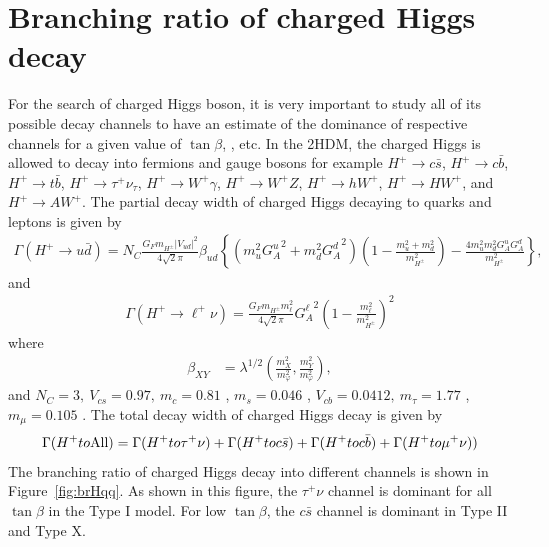 \section{Branching ratio of charged Higgs decay}
\label{s:brHqq}
For the search of charged Higgs boson, it is very important to study all of its 
possible decay channels to have an estimate of the dominance of respective
channels for a given value of $\tan\beta$, \mHp, etc. In the 2HDM, the charged
Higgs is allowed to decay into fermions and gauge bosons for example 
$H^+ \rightarrow c\bar{s}$, $H^+ \rightarrow c\bar{b}$, 
$H^+ \rightarrow t\bar{b}$, $H^+ \rightarrow \tau^+\nu_\tau$, 
$H^+ \rightarrow W^+\gamma$, $H^+ \rightarrow W^+Z$, $H^+ \rightarrow hW^+$, 
$H^+ \rightarrow HW^+$, and $H^+ \rightarrow AW^+$. The partial decay width of charged 
Higgs decaying to quarks and leptons is given by \cite{PhysRevD.80.015017}
\begin{align}
\Gamma(H^+\to u{\bar d}) = N_C
\frac{G_Fm_{H^\pm}^{}\left|V_{ud}\right|^2}{4\sqrt2\pi}\beta_{ud}^{}
\left\{\left(m_u^2{G^u_A}^2+m_d^2{G^d_A}^2\right)
\left(1-\frac{m_u^2+m_d^2}{m_{H^\pm}^2}\right)-\frac{4m_u^2m_d^2
{G^u_A}{G^d_A}}{m_{H^\pm}^2}\right\},
\label{Eq:H+ud}
\end{align}
and 
\begin{align}
\Gamma(H^+\to \ell^+\nu) =
\frac{G_Fm_{H^\pm}^{}m_\ell^2}{4\sqrt2\pi}{G^\ell_A}^2
\left(1-\frac{m_\ell^2}{m_{H^\pm}^2}\right)^2
\label{Eq:H+nul}
\end{align}
where 
\begin{align}
\beta_{XY}^{} &= \lambda^{1/2}\left(\frac{m_X^2}{m_\varphi^2},
\frac{m_Y^2}{m_\varphi^2}\right),
\end{align}
and $ N_C = 3, ~V_{cs} = 0.97, ~m_c = 0.81$ \GeV, $m_s = 0.046$ \GeV, $V_{cb} = 
0.0412, ~m_\tau = 1.77$ \GeV, $m_\mu = 0.105$ \GeV. The total decay width of charged
Higgs decay is given by
\begin{align}
\Gamma(H^+\to \rm{All}) = \Gamma(H^+\to \tau^+\nu) + \Gamma(H^+\to c\bar{s}) + 
\Gamma(H^+\to c\bar{b}) + \Gamma(H^+\to \mu^+\nu))
\end{align}
The branching ratio of charged Higgs decay into different channels is shown in
Figure~\ref{fig:brHqq}. As shown in this figure, the $\tau^+\nu$ channel is
dominant for all $\tan\beta$ in the Type I model. For low $\tan\beta$, the 
$c\bar{s}$ channel is dominant in Type II and Type X. 
